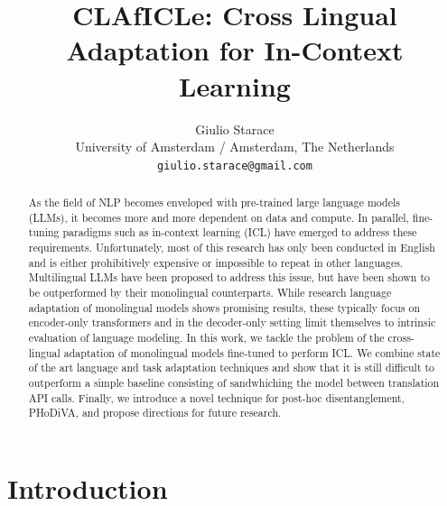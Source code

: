 \documentclass[11pt]{article}
\title{CLAfICLe: Cross Lingual Adaptation for In-Context Learning}
\author{Giulio Starace \\
  University of Amsterdam / Amsterdam, The Netherlands \\
  \texttt{giulio.starace@gmail.com} \\}
\begin{document}
\maketitle
\begin{abstract}

	As the field of NLP becomes enveloped with pre-trained large language models (LLMs), it becomes
	more and more dependent on data and compute. In parallel, fine-tuning paradigms such as in-context
	learning (ICL) have emerged to address these requirements. Unfortunately, most of this research
	has only been conducted in English and is either prohibitively expensive or impossible to repeat
	in other languages. Multilingual LLMs have been proposed to address this issue, but have been
	shown to be outperformed by their monolingual counterparts. While research language adaptation of
	monolingual models shows promising results, these typically focus on encoder-only transformers and
	in the decoder-only setting limit themselves to intrinsic evaluation of language modeling. In this
	work, we tackle the problem of the cross-lingual adaptation of monolingual models fine-tuned to
	perform ICL. We combine state of the art language and task adaptation techniques and show that it
	is still difficult to outperform a simple baseline consisting of sandwhiching the model between
	translation API calls. Finally, we introduce a novel technique for post-hoc disentanglement,
	PHoDiVA, and propose directions for future research.

\end{abstract}

\section{Introduction}
\end{document}
